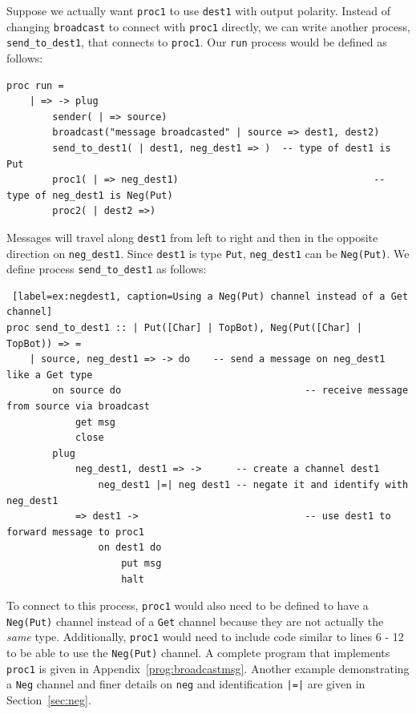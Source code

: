 \documentclass[11pt]{article}
\begin{document}
Suppose we actually want \lstinline$proc1$ to use \lstinline$dest1$ with output polarity.
Instead of changing \lstinline$broadcast$ to connect with \lstinline$proc1$ directly, we can write another process, \lstinline$send_to_dest1$, that connects to \lstinline$proc1$.
Our \lstinline$run$ process would be defined as follows:
\begin{lstlisting}
proc run =
	| => -> plug
		sender( | => source)
		broadcast("message broadcasted" | source => dest1, dest2)
		send_to_dest1( | dest1, neg_dest1 => )	-- type of dest1 is Put 
		proc1( | => neg_dest1)									-- type of neg_dest1 is Neg(Put)
		proc2( | dest2 =>)
\end{lstlisting}	
Messages will travel along \lstinline$dest1$ from left to right and then in the opposite direction on \lstinline$neg_dest1$.
Since \lstinline$dest1$ is type \lstinline$Put$, \lstinline$neg_dest1$ can be \lstinline$Neg(Put)$. 
We define process \lstinline$send_to_dest1$ as follows:
\begin{lstlisting} [label=ex:negdest1, caption=Using a Neg(Put) channel instead of a Get channel] 
proc send_to_dest1 :: | Put([Char] | TopBot), Neg(Put([Char] | TopBot)) => =
	| source, neg_dest1 => -> do	-- send a message on neg_dest1 like a Get type
		on source do								-- receive message from source via broadcast
			get msg
			close
		plug
			neg_dest1, dest1 => -> 		-- create a channel dest1
				neg_dest1 |=| neg dest1 -- negate it and identify with neg_dest1
			=> dest1 -> 							-- use dest1 to forward message to proc1
				on dest1 do	
					put msg
					halt
\end{lstlisting}
To connect to this process, \lstinline$proc1$ would also need to be defined to have a \lstinline$Neg(Put)$ channel instead of a \lstinline$Get$ channel because they are not actually the {\em same} type.
Additionally, \lstinline$proc1$ would need to include code similar to lines 6 - 12 to be able to use the \lstinline$Neg(Put)$ channel.
A complete program that implements \lstinline$proc1$ is given in Appendix~\ref{prog:broadcastmsg}.
Another example demonstrating a \lstinline$Neg$ channel and finer details on \lstinline$neg$ and identification \lstinline$|=|$ are given in Section~\ref{sec:neg}.
\end{document}
